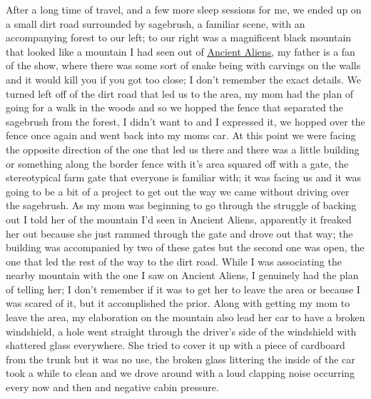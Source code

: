 \documentclass[12pt]{article}
\begin{document}
After a long time of travel, and a few more sleep sessions for me, we ended up
on a small dirt road surrounded by sagebrush, a familiar scene, with an
accompanying forest to our left; to our right was a magnificent black mountain
that looked like a mountain I had seen out of
{\color{blue}\underline{\href{https://www.history.com/shows/ancient-aliens}
{Ancient Aliens}}}, my father is a fan of the show, where there was some sort of
snake being with carvings on the walls and it would kill you if you got too
close; I don't remember the exact details. We turned left off of the dirt road
that led us to the area, my mom had the plan of going for a walk in the woods
and so we hopped the fence that separated the sagebrush from the forest,
I didn't want to and I expressed it, we hopped over the fence once again and
went back into my moms car. At this point we were facing the opposite direction
of the one that led us there and there was a little building or something along
the border fence with it's area squared off with a gate, the stereotypical farm
gate that everyone is familiar with; it was facing us and it was going to be
a bit of a project to get out the way we came without driving over the
sagebrush. As my mom was beginning to go through the struggle of backing out
I told her of the mountain I'd seen in Ancient Aliens, apparently it freaked her
out because she just rammed through the gate and drove out that way; the
building was accompanied by two of these gates but the second one was open, the
one that led the rest of the way to the dirt road. While I was associating the
nearby mountain with the one I saw on Ancient Aliens, I genuinely had the plan
of telling her; I don't remember if it was to get her to leave the area or
because I was scared of it, but it accomplished the prior. Along with getting my
mom to leave the area, my elaboration on the mountain also lead her car to have
a broken windshield, a hole went straight through the driver's side of the
windshield with shattered glass everywhere. She tried to cover it up with
a piece of cardboard from the trunk but it was no use, the broken glass
littering the inside of the car took a while to clean and we drove around with
a loud clapping noise occurring every now and then and negative cabin pressure.
\end{document}
